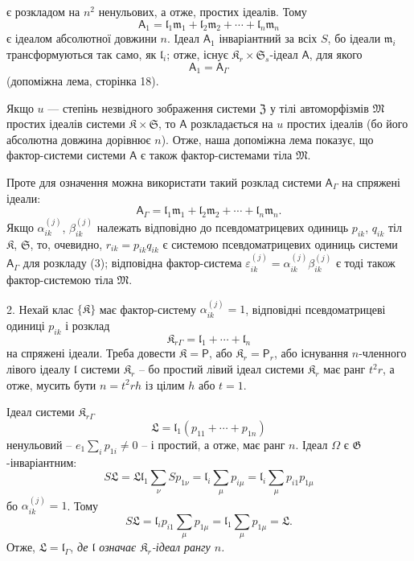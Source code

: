 \documentclass[11pt]{article}
\begin{document}
є розкладом на \(n^2\) ненульових, а отже, простих ідеалів. Тому
\[
\mathsf{A}_1=\mathfrak l_1\mathfrak m_1+\mathfrak l_2\mathfrak m_2+\cdots+\mathfrak l_n\mathfrak m_n
\]
є ідеалом абсолютної довжини \(n\). Ідеал \(\mathsf{A}_1\) інваріантний за всіх \(S\), бо ідеали \(\mathfrak m_i\) трансформуються так само, як \(\mathfrak l_i\); отже, існує \(\mathfrak K_r\times\mathfrak S_s\)-ідеал \(\mathsf{A}\), для якого
\[
\mathsf{A}_1=\mathsf{A}_\Gamma
\]
(допоміжна лема, сторінка 18).

Якщо \(u\) --- степінь незвідного зображення системи \(\mathfrak Z\) у тілі автоморфізмів \(\mathfrak M\) простих ідеалів системи \(\mathfrak K\times\mathfrak S\), то \(\mathsf{A}\) розкладається на \(u\) простих ідеалів (бо його абсолютна довжина дорівнює \(n\)). Отже, наша допоміжна лема показує, що фактор-системи системи \(\mathsf{A}\) є також фактор-системами тіла \(\mathfrak M\).

Проте для означення можна використати такий розклад системи \(\mathsf{A}_\Gamma\) на спряжені ідеали:
\[
\tag{3}
\mathsf{A}_\Gamma=\mathfrak l_1\mathfrak m_1+\mathfrak l_2\mathfrak m_2+\cdots+\mathfrak l_n\mathfrak m_n.
\]
Якщо \(\alpha_{ik}^{(j)}\), \(\beta_{ik}^{(j)}\) належать відповідно до псевдоматрицевих одиниць \(p_{ik}\), \(q_{ik}\) тіл \(\mathfrak K\), \(\mathfrak S\), то, очевидно, \(r_{ik}=p_{ik}q_{ik}\) є системою псевдоматрицевих одиниць системи \(\mathsf{A}_\Gamma\) для розкладу (3); відповідна фактор-система \(\varepsilon_{ik}^{(j)}=\alpha_{ik}^{(j)}\beta_{ik}^{(j)}\) є тоді також фактор-системою тіла \(\mathfrak M\).

2. Нехай клас \(\{\mathfrak K\}\) має фактор-систему \(\alpha_{ik}^{(j)}=1\), відповідні псевдоматрицеві одиниці \(p_{ik}\) і розклад
\[
\mathfrak K_{r\Gamma}=\mathfrak l_1+\cdots+\mathfrak l_n
\]
на спряжені ідеали. Треба довести \(\mathfrak K=\mathsf P\), або \(\mathfrak K_r=\mathsf P_r\), або існування \(n\)-членного лівого ідеалу \(\mathfrak l\) системи \(\mathfrak K_r\) -- бо простий лівий ідеал системи \(\mathfrak K_r\) має ранг \(t^2r\), а отже, мусить бути \(n=t^2rh\) із цілим \(h\) або \(t=1\).

Ідеал системи \(\mathfrak K_{r\Gamma}\)
\[
\mathfrak L=\mathfrak l_1(p_{11}+\cdots+p_{1n})
\]
ненульовий -- \(e_1\sum_i p_{1i}\ne0\) -- і простий, а отже, має ранг \(n\). Ідеал \(\Omega\) є \(\mathfrak G\)-інваріантним:
\[
S\mathfrak L
=\mathfrak L\mathfrak l_1\sum_\nu S p_{1\nu}
=\mathfrak l_i\sum_\mu p_{i\mu}
=\mathfrak l_i\sum_\mu p_{i1}p_{1\mu}
\]
бо \(\alpha_{ik}^{(j)}=1\). Тому
\[
S\mathfrak L=\mathfrak l_ip_{i1}\sum_\mu p_{1\mu}
=\mathfrak l_1\sum_\mu p_{1\mu}
=\mathfrak L.
\]
Отже, \(\mathfrak L=\mathfrak l_\Gamma\), \emph{де \(\mathfrak l\) означає \(\mathfrak K_r\)-ідеал рангу \(n\).}
\end{document}
